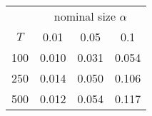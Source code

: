 % 
\begin{tabular}{cccc}
  \hline
  & \multicolumn{3}{c}{nominal size $\alpha$} \\
 $T$ & 0.01 & 0.05 & 0.1 \\
 \hline
100 & 0.010 & 0.031 & 0.054 \\ 
  250 & 0.014 & 0.050 & 0.106 \\ 
  500 & 0.012 & 0.054 & 0.117 \\ 
   \hline
\end{tabular}

